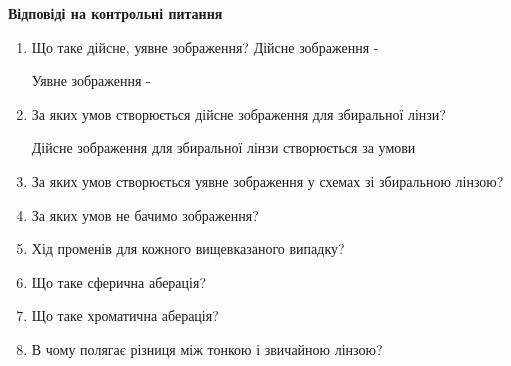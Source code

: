 \begin{center}
    \Large{\textbf{Відповіді на контрольні питання}}    
\end{center}

\vspace{1mm}

\begin{enumerate}
    \item Що таке дійсне, уявне зображення?  
    \bigbreak
    Дійсне зображення - 

    Уявне зображення - 

    \item За яких умов створюється дійсне зображення для збиральної лінзи?
    \bigbreak
    
    Дійсне зображення для збиральної лінзи створюється за умови

    \item За яких умов створюється уявне зображення у схемах зі збиральною лінзою?
    \bigbreak

    \item За яких умов не бачимо зображення?
    \bigbreak

    \item Хід променів для кожного вищевказаного випадку?
    \bigbreak

    \item Що таке сферична аберація?
    \bigbreak

    \item Що таке хроматична аберація?
    \bigbreak

    \item В чому полягає різниця між тонкою і звичайною лінзою?
    \bigbreak

\end{enumerate}